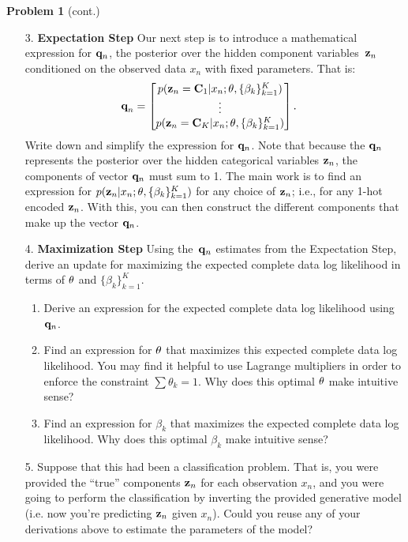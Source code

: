\documentclass[submit]{harvardml}
\begin{document}
\newpage


\begin{framed}
\noindent\textbf{Problem 1} (cont.)\\
\begin{enumerate}
\item[3.] \textbf{Expectation Step} Our next step is to introduce a
  mathematical expression for $\mathbf{q}_n$, the posterior over the
  hidden component variables~$\mathbf{z}_n$ conditioned on the observed data
  $x_n$ with fixed parameters.
That is:
  \begin{align*}
    \textbf{q}_n &= \begin{bmatrix}
      p(\mathbf{z}_n =\mathbf{C}_1| x_n; \mathbf{\theta}, \{ \beta_k \}^K_{k=1}) \\
      \vdots \\
      p(\mathbf{z}_n =\mathbf{C}_K| x_n; \mathbf{\theta}, \{ \beta_k \}^K_{k=1})
    \end{bmatrix}.
  \end{align*}
%
  Write down and simplify the expression for
  $\mathbf{q}_n$.  Note that because the $\mathbf{q}_n$ represents the
  posterior over the hidden categorical variables $\mathbf{z}_n$, the
  components of vector $\mathbf{q}_n$ must sum to 1.
  The main work is to find an expression for $p(\mathbf{z}_n|x_n; \mathbf{\theta}, \{\beta_k\}^K_{k=1})$  for any choice of $\mathbf{z}_n$; i.e., for any 1-hot encoded $\mathbf{z}_n$. With this, you can then construct the different components that make up the vector $\mathbf{q}_n$.
  
\item[4.] \textbf{Maximization Step}
Using the~$\mathbf{q}_n$ estimates from the Expectation Step, derive an update for maximizing the expected complete data log likelihood in terms of $\mathbf{\theta}$ and $\{ \beta_k \}^K_{k=1}$.

\begin{enumerate}
    \item Derive an expression for the expected complete data log likelihood using $\mathbf{q}_n$.
    \item Find an expression for $\mathbf{\theta}$ that maximizes this expected complete data log likelihood. You may find it helpful to use Lagrange multipliers in order to enforce the constraint $\sum \theta_k = 1$. Why does this optimal $\mathbf{\theta}$ make intuitive sense?
    \item Find an expression for $\beta_k$ that maximizes the expected complete data log likelihood.  Why does this optimal $\beta_k$  make intuitive sense?
\end{enumerate}
    
\item[5.] Suppose that this had been a classification problem. That is,
  you were provided the ``true'' components $\mathbf{z}_n$ for each
  observation $x_n$,
  and you were going to perform the classification by
  inverting the provided generative model (i.e. now you're predicting $\mathbf{z}_n$ given $x_n$). Could you reuse any of
  your derivations above to estimate the parameters of the model?
  
\end{enumerate}
  
\end{framed}
\end{document}
